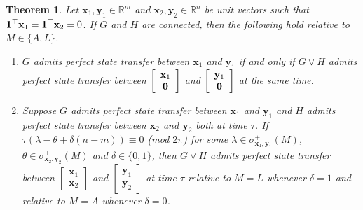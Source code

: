 \documentclass[11pt]{article}
\newtheorem{theorem}{Theorem}
\newcommand{\zero}{{\bf{0}}}
\newcommand{\ones}{{\bf{1}}}
\newcommand{\bx}{\mathbf x}
\newcommand{\by}{\mathbf y}
\def\R{\mathbb{R}}
\begin{document}
\begin{theorem}
Let $\bx_1,\by_1\in\R^{m}$ and $\bx_2,\by_2\in\R^{n}$ be unit vectors such that $\ones^\top\bx_1=\ones^\top\bx_2=0$. If $G$ and $H$ are connected, then the following hold relative to $M\in\{A,L\}$.
\begin{enumerate}
\item $G$ admits perfect state transfer between $\bx_1$ and $\by_1$ if and only if $G\vee H$ admits perfect state transfer between $\left[ \begin{array}{cc} \bx_1 \\ \zero\end{array} \right]$ and $\left[ \begin{array}{cc} \by_1 \\ \zero\end{array} \right]$ at the same time.
\item Suppose $G$ admits perfect state transfer between $\bx_1$ and $\by_1$ and $H$ admits perfect state transfer between $\bx_2$ and $\by_2$ both at time $\tau$. If $\tau(\lambda-\theta+\delta(n-m))\equiv 0$ (mod $2\pi$) for some $\lambda\in\sigma_{\bx_1,\by_1}^+(M)$, $\theta\in\sigma_{\bx_2,\by_2}^+(M)$ and $\delta\in\{0,1\}$, then $G\vee H$ admits perfect state transfer between $\left[ \begin{array}{cc} \bx_1 \\ \bx_2\end{array} \right]$ and $\left[ \begin{array}{cc} \by_1 \\ \by_2\end{array} \right]$ at time $\tau$ relative to $M=L$ whenever $\delta=1$ and relative to $M=A$ whenever $\delta=0$.
\end{enumerate}
\end{theorem}
\end{document}
